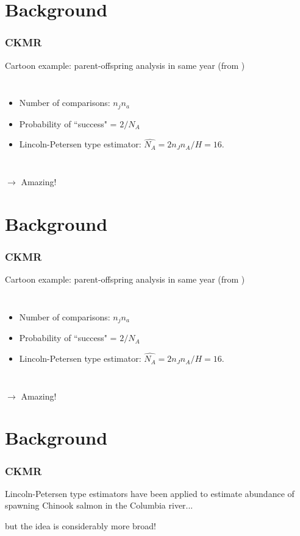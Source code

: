 \documentclass[serif,mathserif]{beamer}
\begin{document}
\section{Background} %
\begin{frame}
\frametitle{CKMR}
  \textcolor{noaaturq}{Cartoon example: parent-offspring analysis in same year (from \citet{BravingtonEtAl2016})}
  \begin{columns}[c]
  \column{2.4in}
    \begin{itemize}
      \item Number of comparisons: $n_j n_a$
      \item Probability of ``success" = $2/N_A$
      \item Lincoln-Petersen type estimator: $\hat{N_A} = 2 n_J n_A / H = 16$.
    \end{itemize}
    \column{1.6in}
  \end{columns} \pause
  \vspace{0.5cm}
  \textcolor{noaaturq}{\huge $\rightarrow$ Amazing!}
\end{frame}

\section{Background} %
\begin{frame}
\frametitle{CKMR}
  \textcolor{noaaturq}{Cartoon example: parent-offspring analysis in same year (from \citet{BravingtonEtAl2016})}
  \begin{columns}[c]
  \column{2.4in}
    \begin{itemize}
      \item Number of comparisons: $n_j n_a$
      \item Probability of ``success" = $2/N_A$
      \item Lincoln-Petersen type estimator: $\hat{N_A} = 2 n_J n_A / H = 16$.
    \end{itemize}
    \column{1.6in}
  \end{columns} \pause
  \vspace{0.5cm}
  \textcolor{noaaturq}{\huge $\rightarrow$ Amazing!}
\end{frame}

\section{Background} %
\begin{frame}
\frametitle{CKMR}
  Lincoln-Petersen type estimators have been applied to estimate abundance of spawning Chinook salmon in the Columbia river...
  \vspace{0.5cm}


  \vspace{0.5cm}
  but the idea is considerably more broad!
\end{frame}
\end{document}
